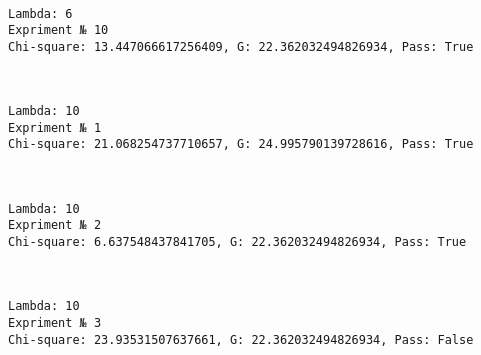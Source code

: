\documentclass[11pt]{article}
\begin{document}
    \begin{center}
    \end{center}
    { \hspace*{\fill} \\}
    
    \begin{Verbatim}[commandchars=\\\{\}]
Lambda: 6
Expriment № 10
Chi-square: 13.447066617256409, G: 22.362032494826934, Pass: True
    \end{Verbatim}

    \begin{center}
    \end{center}
    { \hspace*{\fill} \\}
    
    \begin{Verbatim}[commandchars=\\\{\}]
Lambda: 10
Expriment № 1
Chi-square: 21.068254737710657, G: 24.995790139728616, Pass: True
    \end{Verbatim}

    \begin{center}
    \end{center}
    { \hspace*{\fill} \\}
    
    \begin{Verbatim}[commandchars=\\\{\}]
Lambda: 10
Expriment № 2
Chi-square: 6.637548437841705, G: 22.362032494826934, Pass: True
    \end{Verbatim}

    \begin{center}
    \end{center}
    { \hspace*{\fill} \\}
    
    \begin{Verbatim}[commandchars=\\\{\}]
Lambda: 10
Expriment № 3
Chi-square: 23.93531507637661, G: 22.362032494826934, Pass: False
    \end{Verbatim}
\end{document}

